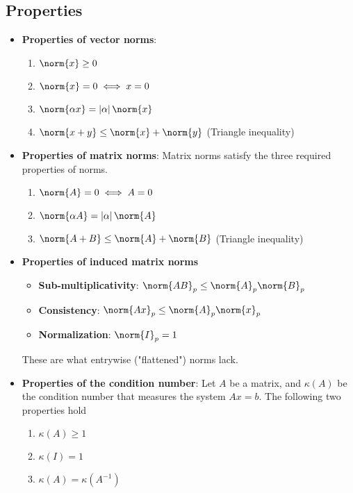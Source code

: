 \documentclass{report}
\begin{document}
    \bigbreak \noindent 
    \subsection{Properties}
    \begin{itemize}
        \item \textbf{Properties of vector norms}: 
            \begin{enumerate}
                \item $\norm{x} \geq 0$
                \item $\norm{x} = 0 \iff x = 0 $
                \item $\norm{\alpha x} = \left\lvert \alpha \right\rvert \norm{x} $
                \item $\norm{x + y} \leq \norm{x} + \norm{y} $ (Triangle inequality)
            \end{enumerate}

        \item \textbf{Properties of matrix norms}: Matrix norms satisfy the three required properties of norms.
            \begin{enumerate}
                \item $\norm{A} = 0 \iff A = 0 $
                \item $\norm{\alpha A} = \left\lvert \alpha \right\rvert \norm{A} $
                \item $\norm{A + B} \leq \norm{A} + \norm{B} $ (Triangle inequality)
            \end{enumerate}
        \item \textbf{Properties of induced matrix norms}
            \begin{itemize}
                \item \textbf{Sub-multiplicativity}: $\norm{AB}_{p} \leq \norm{A}_{p}\norm{B}_{p} $
                \item \textbf{Consistency}: $\norm{Ax}_{p} \leq \norm{A}_{p}\norm{x}_{p} $
                \item \textbf{Normalization}: $\norm{I}_{p} = 1 $
            \end{itemize}
            These are what entrywise ("flattened") norms lack.
        \item \textbf{Properties of the condition number}: Let $A$ be a matrix, and $\kappa(A)$ be the condition number that measures the system $Ax = b$. The following two properties hold
            \begin{enumerate}
                \item $\kappa(A) \geq 1$
                \item $\kappa(I) = 1$
                \item $\kappa(A) = \kappa(A^{-1}) $
            \end{enumerate}


    \end{itemize}
\end{document}
